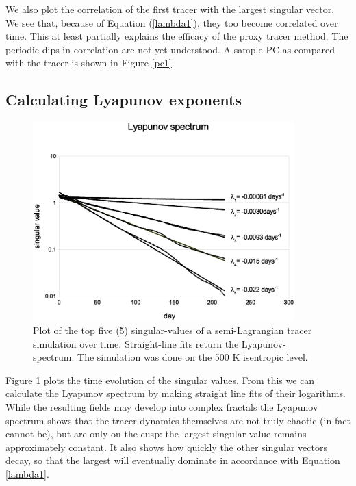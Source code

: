 We also plot the correlation of the first tracer with the largest singular
vector.  We see that, because of Equation (\ref{lambda1}), they too become
correlated over time.
This at least partially explains the efficacy of the proxy tracer method.
The periodic dips in correlation are not yet understood.
A sample PC as compared with the tracer is shown in Figure \ref{pc1}.  

\subsection{Calculating Lyapunov exponents}

\label{Lyapunov_exponents}

\begin{figure}
\begin{center}
\includegraphics[width=0.9\textwidth]{lyap_spec}
\caption{Plot of the top five (5) singular-values of a semi-Lagrangian
tracer simulation over time.  Straight-line fits return the Lyapunov-spectrum.
The simulation was done on the 500 K isentropic level.}
\label{lyap_spec}
\end{center}
\end{figure}

Figure \ref{lyap_spec} plots the time evolution of the singular values.
From this we can calculate the Lyapunov spectrum by making straight line
fits of their logarithms.
While the resulting fields may develop into complex fractals \citep{Mills2009}
the Lyapunov spectrum shows that the tracer dynamics themselves 
are not truly chaotic (in fact cannot be), but are
only on the cusp: the largest singular value remains approximately constant.
It also shows how quickly the other singular vectors decay,
so that the largest will eventually dominate in accordance with
Equation \ref{lambda1}.

